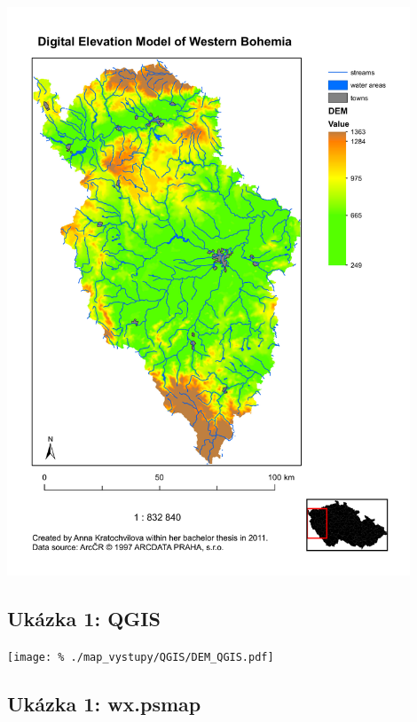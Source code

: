 \documentclass[a4paper,12pt,draft]{article}
\begin{document}
\begin{center}
\includegraphics[width=0.9\textwidth]{./map_vystupy/ArcGIS/dem.pdf}

\end{center}

\newpage
\subsection{Ukázka 1: QGIS}
\label{priloha:vystupy:qgis1}

\begin{center}

\texttt{[image: \%
./map\_vystupy/QGIS/DEM\_QGIS.pdf]}
\end{center}



\newpage
\subsection{Ukázka 1: wx.psmap}
\label{priloha:vystupy:psmap1}
\end{document}
